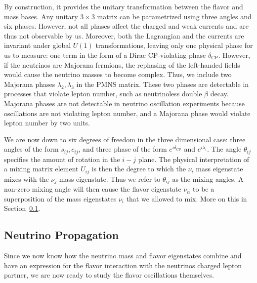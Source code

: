 By construction, it provides the unitary transformation between the flavor and mass bases.
Any unitary $3\times3$ matrix can be parametrized using three angles and six phases. However, not all phases affect the 
charged and weak currents and are thus not observable by us. Moreover, both the Lagrangian and the currents are invariant under global $U(1)$ transformations,
leaving only one physical phase for us to measure: one term in the form of a Dirac CP-violating phase $\delta_\mathrm{CP}$.
However, if the neutrinos are Majorana fermions, the rephasing of the left-handed fields would cause the neutrino masses to become complex.
Thus, we include two Majorana phases $\lambda_{2},\lambda_3$ in the PMNS matrix. These two phases are detectable in processes that violate lepton number, such as neutrinoless double $\beta$ decay.
Majorana phases are not detectable in neutrino oscillation experiments because oscillations are not violating lepton number, and a Majorana phase would
violate lepton number by two units.

We are now down to six degrees of freedom in the three dimensional case: three angles
of the form $s_{ij}, c_{ij}$, and three phase of the form $e^{i\delta_\mathrm{CP}}$ and $e^{i\lambda_{i}}$. The angle $\theta_{ij}$ specifies the amount of rotation in the $i-j$ plane. The physical interpretation of
a mixing matrix element $U_{ij}$ is then the degree to which the $\nu_i$ mass eigenstate mixes with the $\nu_j$ mass eigenstate. Thus we refer to $\theta_{ij}$ as the mixing angles. A non-zero mixing angle will then 
cause the flavor eigenstate $\nu_\alpha$ to be a superposition of the mass eigenstates $\nu_i$ that we allowed to mix. More on this in Section~\ref{sec:prop}.


\subsection{Neutrino Propagation}\label{sec:prop}
Since we now know how the neutrino mass and flavor eigenstates combine and have an expression for the flavor interaction with 
the neutrinos charged lepton partner, we are now ready to study the flavor oscillations themselves.

